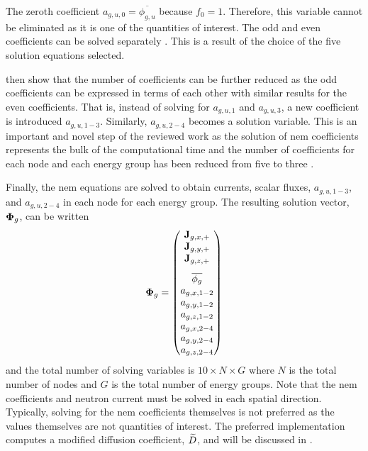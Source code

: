      The zeroth coefficient $a_{g,u,0} = \overline{\phi_{g,u}}$ because $f_0 =
      1$. Therefore, this variable cannot be eliminated as it is one of the
      quantities of interest. The odd and even coefficients can be solved
      separately \cite{gehinThesis}. This is a result of the choice of the five
      solution equations selected. 

      \citeauthor{qe2paper} then show that the number of coefficients can be
      further reduced as the odd coefficients can be expressed in terms of
      each other with similar results for the even coefficients. That is,
      instead of solving for $a_{g,u,1}$ and $a_{g,u,3}$, a new coefficient is
      introduced $a_{g,u,1-3}$. Similarly, $a_{g,u,2-4}$ becomes a solution
      variable. This is an important and novel step of the reviewed work as the
      solution of \gls{nem} coefficients represents the bulk of the
      computational time and the number of coefficients for each node and each
      energy group has been reduced from five to three
      \cite{qe2paper}.

      Finally, the \gls{nem} equations are solved to obtain currents, scalar
      fluxes, $a_{g,u,1-3}$, and $a_{g,u,2-4}$ in each node for each energy
      group. The resulting solution vector, $\mathbf{\Phi}_g$, can be written 
      \begin{equation}
        \label{eq:solution_vector}
        \vPhi_g =
        \begin{pmatrix}
          \current_{g,x,+} \\
          \current_{g,y,+} \\
          \vspace{8pt}
          \current_{g,z,+} \\
          \overline{\phi_g} \\
          a_{g,x,1-2} \\
          a_{g,y,1-2} \\
          a_{g,z,1-2} \\
          a_{g,x,2-4} \\
          a_{g,y,2-4} \\
          a_{g,z,2-4}
        \end{pmatrix}
      \end{equation}
      and the total number of solving variables is $10 \times N \times G$ where
      $N$ is the total number of nodes and $G$ is the total number of energy
      groups. Note that the \gls{nem} coefficients and neutron current must be
      solved in each spatial direction. Typically, solving for the \gls{nem}
      coefficients themselves is not preferred as the values themselves are not
      quantities of interest.  The preferred implementation computes a modified
      diffusion coefficient, $\widetilde{D}$, and will be discussed in
      .

